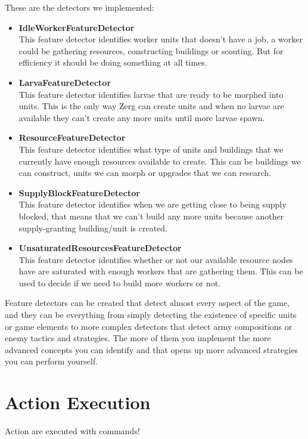 These are the detectors we implemented: 
\begin{itemize}
\item \textbf{IdleWorkerFeatureDetector} \\
This feature detector identifies worker units that doesn't have a job, a worker could be gathering resources, constructing buildings or scouting. But for efficiency it should be doing something at all times. 
\item \textbf{LarvaFeatureDetector} \\
This feature detector identifies larvae that are ready to be morphed into units. This is the only way Zerg can create units and when no larvae are available they can't create any more units until more larvae spawn. 
\item \textbf{ResourceFeatureDetector} \\
This feature detector identifies what type of units and buildings that we currently have enough resources available to create. This can be buildings we can construct, units we can morph or upgrades that we can research. 
\item \textbf{SupplyBlockFeatureDetector} \\
This feature detector identifies when we are getting close to being supply blocked, that means that we can't build any more units because another supply-granting building/unit is created.
\item \textbf{UnsaturatedResourcesFeatureDetector} \\
This feature detector identifies whether or not our available resource nodes have are saturated with enough workers that are gathering them. This can be used to decide if we need to build more workers or not.
\end{itemize}

Feature detectors can be created that detect almost every aspect of the game, and they can be everything from simply detecting the existence of specific units or game elements to more complex detectors that detect army compositions or enemy tactics and strategies. The more of them you implement the more advanced concepts you can identify and that opens up more advanced strategies you can perform yourself. 



\section{Action Execution}
\label{sec:actionexecution}
Action are executed with commands!
